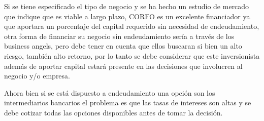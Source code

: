\begin{enumerate}[(a)]
            Si se tiene especificado el tipo de negocio y se ha hecho un estudio de mercado que indique que es viable a largo plazo,
            CORFO es un excelente financiador ya que aportara un porcentaje del capital requerido sin necesidad de endeudamiento, otra forma de
            financiar su negocio sin endeudamiento sería a través de los business angels, pero debe tener en cuenta que ellos buscaran si bien
            un alto riesgo, también alto retorno, por lo tanto se debe considerar que este inversionista además de aportar capital estará presente
            en las decisiones que involucren al negocio y/o empresa.

            Ahora bien si se está dispuesto a endeudamiento una opción son los intermediarios bancarios el problema es que las tasas de intereses 
            son altas y se debe cotizar todas las opciones disponibles antes de tomar la decisión.

            

\end{enumerate}
